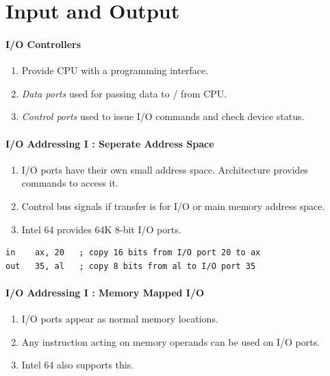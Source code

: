 \documentclass[twocolumn,english]{article}
\begin{document}
\section{Input and Output}


\paragraph{I/O Controllers}
\begin{enumerate}
\item Provide CPU with a programming interface.
\item \emph{Data ports} used for passing data to / from CPU.
\item \emph{Control ports} used to issue I/O commands and check device status.
\end{enumerate}

\paragraph{I/O Addressing I : Seperate Address Space}
\begin{enumerate}
\item I/O ports have their own small address space. Architecture provides
commands to access it.
\item Control bus signals if transfer is for I/O or main memory address
space.
\item Intel 64 provides 64K 8-bit I/O ports.
\end{enumerate}
\noindent 
\begin{lstlisting}[basicstyle={\footnotesize\ttfamily},frame=single]
in    ax, 20   ; copy 16 bits from I/O port 20 to ax 
out   35, al   ; copy 8 bits from al to I/O port 35
\end{lstlisting}



\paragraph{I/O Addressing I : Memory Mapped I/O}
\begin{enumerate}
\item I/O ports appear as normal memory locations.
\item Any instruction acting on memory operands can be used on I/O ports.
\item Intel 64 also supports this.
\end{enumerate}
\end{document}
